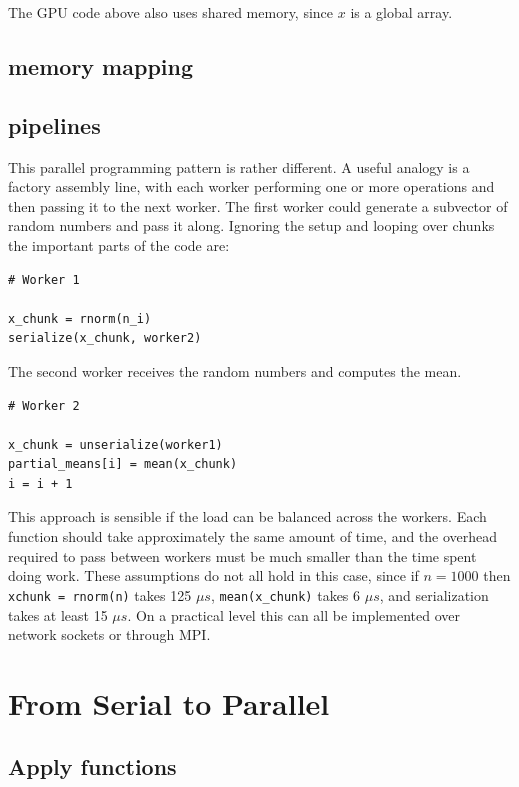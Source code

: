 \documentclass[12pt]{article}
\begin{document}
The GPU code above also uses shared memory, since $x$ is a global array.

\subsection{memory mapping}

\subsection{pipelines}

This parallel programming pattern is rather different. A useful analogy is a
factory assembly line, with each worker performing one or more operations
and then passing it to the next worker. The first worker could generate a
subvector of random numbers and pass it along. Ignoring the setup and
looping over chunks the important parts of the code are:

\begin{verbatim}
# Worker 1

x_chunk = rnorm(n_i)
serialize(x_chunk, worker2)
\end{verbatim}

The second worker receives the random numbers and computes the mean.

\begin{verbatim}
# Worker 2

x_chunk = unserialize(worker1)
partial_means[i] = mean(x_chunk)
i = i + 1
\end{verbatim}

This approach is sensible if the load can be balanced across the workers.
Each function should take approximately the same amount of time, and the
overhead required to pass between workers must be much smaller than the
time spent doing work. These assumptions do not all hold in this case,
since if $n = 1000$ then \texttt{xchunk = rnorm(n)} takes 125 $\mu s$,
\texttt{mean(x\_chunk)} takes 6 $\mu s$, and serialization takes at least
15 $\mu s$. On a practical level this can all be implemented over network
sockets or through MPI.

\section{From Serial to Parallel}

\subsection{Apply functions}
\end{document}
